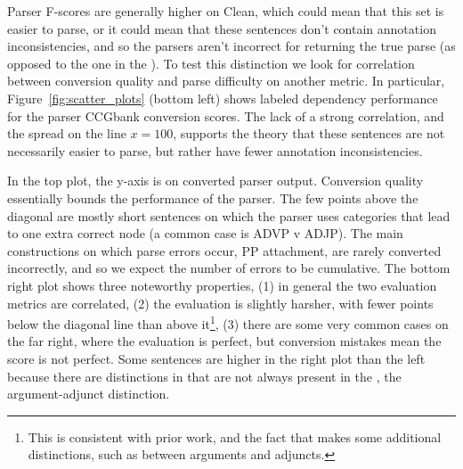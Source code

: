 Parser F-scores are generally higher on Clean, which could mean that this
set is easier to parse, or it could mean that these sentences don't contain
annotation inconsistencies, and so the parsers aren't incorrect for returning
the true parse (as opposed to the one in the \ptb).  To test this distinction
we look for correlation between conversion quality and parse difficulty on
another metric.  In particular, Figure~\ref{fig:scatter_plots} (bottom left) shows
\ccg labeled dependency performance for the \candc parser \myvs CCGbank
conversion \parseval scores. The lack of a strong correlation, and the spread
on the line $x=100$, supports the theory that these sentences are not
necessarily easier to parse, but rather have fewer annotation inconsistencies.

In the top plot, the y-axis is \parseval on converted \candc parser output.
Conversion quality essentially bounds the performance of the parser.
The few points above the diagonal are mostly short sentences on which the \candc parser uses categories that lead to one extra correct node (a common case is ADVP v ADJP).
The main constructions on which parse errors occur, \myeg PP attachment, are rarely converted incorrectly, and so we expect the number of errors to be cumulative.
The bottom right plot shows three noteworthy properties, (1) in general the two evaluation metrics are correlated, (2) the \ccg evaluation is slightly harsher, with fewer points below the diagonal line than above it\footnote{This is consistent with prior work, and the fact that \ccg makes some additional distinctions, such as between arguments and adjuncts.}, (3) there are some very common cases on the far right, where the \ccg evaluation is perfect, but conversion mistakes mean the \ptb score is not perfect.
Some sentences are higher in the right plot than the left because there are distinctions in \ccg that are not always present in the \ptb, \myeg the argument-adjunct distinction.

